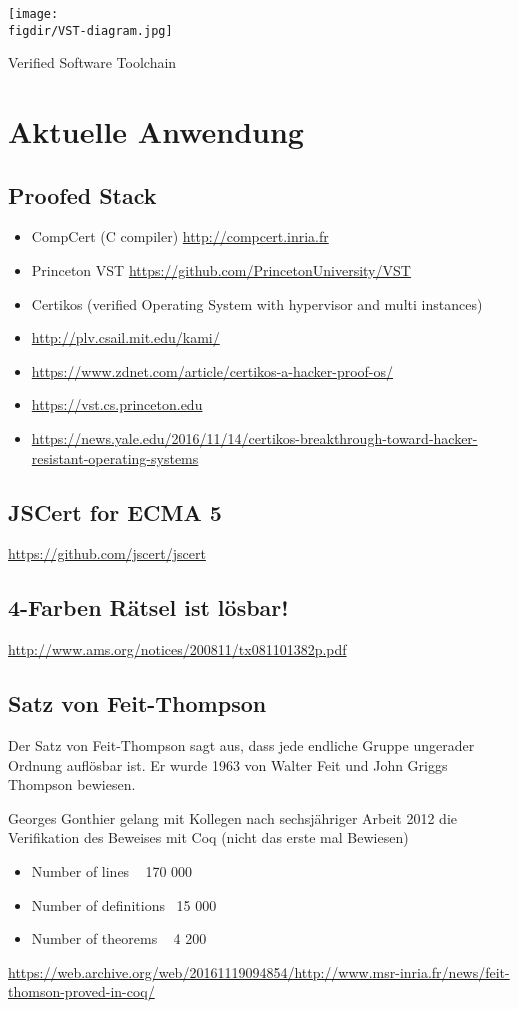 \begin{minipage}{\textwidth}
	\centering
	\captionsetup{type=figure}
	\texttt{[image: \\figdir/VST-diagram.jpg]}
	\caption{Verified Software Toolchain\cite{PRINCETON01:VST}}
	\label{fig:vst}
\end{minipage}

\section{Aktuelle Anwendung}
\label{s:current-usage}

\subsection{Proofed Stack}
\begin{itemize}
	\item CompCert (C compiler) \url{http://compcert.inria.fr}
	\item Princeton VST \url{https://github.com/PrincetonUniversity/VST}
	\item Certikos (verified Operating System with hypervisor and multi instances)
	\item \url{http://plv.csail.mit.edu/kami/}
	\item \url{https://www.zdnet.com/article/certikos-a-hacker-proof-os/}
	\item \url{https://vst.cs.princeton.edu}
	\item \url{https://news.yale.edu/2016/11/14/certikos-breakthrough-toward-hacker-resistant-operating-systems}
\end{itemize}
\subsection{JSCert for ECMA 5}
\url{https://github.com/jscert/jscert}
\subsection{4-Farben Rätsel ist lösbar!}
\url{http://www.ams.org/notices/200811/tx081101382p.pdf}
\subsection{Satz von Feit-Thompson}
Der Satz von Feit-Thompson sagt aus, dass jede endliche Gruppe ungerader Ordnung auflösbar ist. Er wurde 1963 von Walter Feit und John Griggs Thompson bewiesen.

Georges Gonthier gelang mit Kollegen nach sechsjähriger Arbeit 2012 die Verifikation des Beweises mit Coq (nicht das erste mal Bewiesen)
\begin{itemize}
	\item Number of lines ~ 170 000
	\item Number of definitions ~15 000
	\item Number of theorems ~ 4 200
\end{itemize}
\url{https://web.archive.org/web/20161119094854/http://www.msr-inria.fr/news/feit-thomson-proved-in-coq/}
